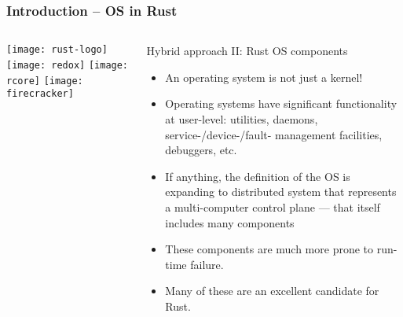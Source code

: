 \begin{frame}[plain]
	\frametitle{Introduction -- OS in Rust}
	
	
	
	\begin{columns}
		
		\begin{column}{.2\textwidth}
			
			\texttt{[image: rust-logo]}
			\texttt{[image: redox]}
			\texttt{[image: rcore]}
			\texttt{[image: firecracker]}
		\end{column}
		
		\begin{column}{.8\textwidth}
			
			Hybrid approach II: Rust OS components

			\begin{itemize}
				
				\item  An operating system is not just a kernel!

				\item Operating systems have significant functionality at user-level:
				utilities, daemons, service-/device-/fault- management facilities,
				debuggers, etc.

				\item  If anything, the definition of the OS is expanding to distributed
				system that represents a multi-computer control plane — that
				itself includes many components
				
				
				\item These components are much more prone to run-time failure.
				
				\item Many of these are an excellent candidate for Rust.
				
			\end{itemize}
			
		\end{column}
		
		
	\end{columns}
	
	
\end{frame}


